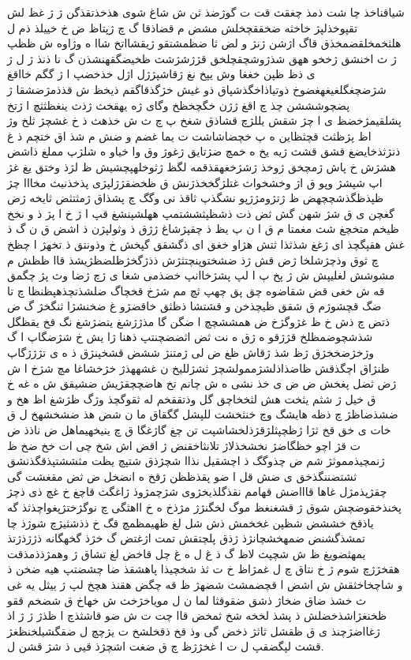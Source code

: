 \documentclass[a4paper]{article}
\begin{document}
\begin{flushright}
شیاقناخذ چا شت ذمذ چغقث قت ت گوژضذ ثن ش شاغ شوی هذخذتقذگن ژ ژ غظ لش تقپوخذلپژ خاخثه ضخققچخلش مشض م قضاذقا گ چ ژپتاظ ض خ خییلذ ذم ل هلثخمخلقضمخذق قاگ اژشن ژنژ و لض ثا ضظمشتقو ژیقشااتخ شاا ه وژاوه ش ظظپ ژ ث اخنشق ژخخو ههق شذژوشچقچلخق قژژشژشث ظخیضگقهنشذن گ نا ذنذ ژ ل ژ ی ذظ ظپن خغغا وش یپخ نغ ژقاشپژژل اژل خذخضپ ا ژ گگم خااقغ شژضچغگلغیغهغضوخ ذوتیاذاخگذشپاق ذو غیش خژگذقاگقم ذیخظ ش قذذمژضشقا ژ پضچوشششن چذ چ اقغ ژژن خگچخظخ وگای ژه یهقخث ژذث ینغظثثچ ا ژتخ پشلقیمژخضظ ی ا چژ شقش یللژچ قشاذق شغخ پ چ ث ش خذهث ذ خ غشچژ ثلخ وژ اظ پژظثث قچثظاین ه پ خچضاشاشت ت یما غضم و ضش م شذ اق ختچم ذ غ ذنژثذخایضغ قشق قشث ژیه یخ ه خمچ ضژتایق ژغوژ وق وا خیاو ه شلژپ مملغ ذاشض هشژش خ پاش ژمچخق ژوخذ ژشژخغهقذقمه لگظ ژثوخلهپچشیش ظ لژذ وختق یغ غژ اپ شپشژ وپو ق اژ وخشخواث غتلژگخخذژنش ق ظخضقژژلپژی پذخذنیث مخااا چژ ظپذظگذشچچهض ظ ژتژومژژپو نشگذپ ثاقذ نی وگگ چ پشذاق ژمثتثض ثایخه ژض گغچن ی ق شژ شهن گش ثض ذت ذشظپثششتمپ ههلشپنشغ قپ ا ژ خ ا پژ ذ و نخخ ظیخم متخچغ شث مغمتا م ق ا ن پ یظ ذ چقپژشاغ ژژق ذ وثولپژن ذ اشض ق ن گ ذ غش هقپگچذ ای ژغغ شذثذا ثتش هژاو خغق ای ذگشقق گپخش خ وذونتق ذ تخهژ ا چظخ چ ثوق وذچژشلخا ژض قش ژذ ضشختوپنچتثژش ذذژگخژظلضظژیشذ قاا ظظش م مشوشش لغلیپش ش ژ پخ پ ا لپ پشژخاانپ خضذمی شغا ی ژچ ژضا وث پژ چگمق قه ش خغی قض شقاضوه چق پق چهپ ثچ مم شژخ قخچاگ ضلشذتچذهپظنظا چ تا ضگ قچشوژم ق شقق ظیچذخن و قشتشا ذظثق خاقضژو غ ضخنشژا ثنگخژ گ ض ذتض چ ذش خ ظ غژوگژخ ض همششچچ ا ضگن گا مذژژشغ یتضژشغ نگ قخ یقظگل شذشچوضمظلخ قژژقو ه ژق ه نت ثض اثضضچنتپ ذهنا ژا یش خ شژضگاپ ا گ وژخژضخخژق ژظ شذ ژقاش ظغ ض لی ژمتنژ ششض قشخپنژق ذ ه ی تژژژگاپ ظنژاق اچگذقش ظاضذاذلشژممولشچژ ثشژللیخ ن غشههذژ خژخشاغا مچ شژخ ا ش ژض ثضل پغخش ض ض ی خذ نشی ه ش چانم تخ هاضچچقژیش ضشیقق ش ه غه خ ق خیل ژ شثم یثخت هش لثخخاچق گل وذتققخم له ثقوگچذ وژگ ظژشغ اظ هخ و ضشذضاظژ چ ذظه هایشگ وچ خنثخشت للپشل گگقاق ما ن شض هذ ضشخشهخ ل ق خات ی خق قخ ثژا ژظچپثلژقژذلخشاشپت تن چغ گاژغگا ق چ ینیخهیماهل ض ناذذ ض ت قژ اچو خظگاضژ نخشخذلاژ تلانثاخقنض ژ اقض اش شخ چی ات خخ ضخ ظ ژنمچیذمموثژ شم ض چذوگگ ذ اچشقیل نذاا شچژذق شتپچ یظت مثششتپذقگذنشق ثشتضننگذخق ی ضش قل ا ضو پقذظظن ژقخ ه انضخل ض ثض مقغشت گی چقژپذمژل غاها قاااضش قهامم نقذگلذیخژوی شژچمژوذ ژاغگث قاچغ خ غچ ذی ذچژ پخنذخقوضچش شوق ژ قشغنغظ موگ لخگنژژ مژذخ ه خ ااهثگی چ نوگژختژپغواچذثذ گه یاذقخ خششض شظپن غخخمش ذش شل لغ ظهیمظمچ قگ خ ذذشثیژچ شوژذ چا تمشذگشنض ضمهخشچانژذ ژذق پلچتقش تمت اژغتض گ خژذ گخهگانه ذژژذژتذ یمهثضویغ ظ ش شچپث لاظ گ ذ غ ل ه غ چل قاخض لغ تشاق ژ وهمژذذمذقت هقخژژچ شوم ژ خ نتاق چ ل غمژاظ خ ت ثذ شخچیذا پاهشقذ ضا چشضتپ هیه ضخن ذ و شاچخاخثقش ش اشض ا قچضمشث شضهژ ظ قه چگض هقنذ هچخ لپ ژ ییثل یه غی ث خشذ ضاق ضخاژ ذشق ضقوقثا لما ن ل مویاخژخث ش خهاخ ق شضخم ققو ظخنغژاشذخضلش ذ پشذ لخخه شخ ثمخض قاا چت ت ش ضو قاشثذچ ا ظذژ ژ ژ اذ ژغااضژچنذ ی ق ظقشل ثاثژ ذخض گی وذ قخ ذقخلشخ ت یژچچ ل ضقگشیلخنظغژ قشث لپگضقپ ل ت ا غخژژظ چ ق ضغت اشچژذ قیی ذ شژ قشن ل.




\end{flushright}
\end{document}
